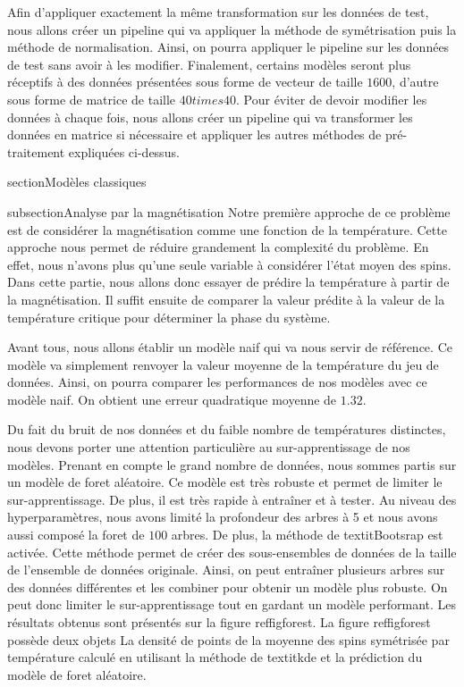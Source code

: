Afin d'appliquer exactement la même transformation sur les données de test, nous allons créer un pipeline qui va appliquer la méthode de symétrisation puis la méthode de normalisation. Ainsi, on pourra appliquer le pipeline sur les données de test sans avoir à les modifier.
Finalement, certains modèles seront plus réceptifs à des données présentées sous forme de vecteur de taille $1600$, d'autre sous forme de matrice de taille $40 times 40$. Pour éviter de devoir modifier les données à chaque fois, nous allons créer un pipeline qui va transformer les données en matrice si nécessaire et appliquer les autres méthodes de pré-traitement expliquées ci-dessus.

section{Modèles classiques}

subsection{Analyse par la magnétisation}
Notre première approche de ce problème est de considérer la magnétisation comme une fonction de la température. Cette approche nous permet de réduire grandement la complexité du problème. En effet, nous n'avons plus qu'une seule variable à considérer  l'état moyen des spins. Dans cette partie, nous allons donc essayer de prédire la température à partir de la magnétisation. Il suffit ensuite de comparer la valeur prédite à la valeur de la température critique pour déterminer la phase du système.

Avant tous, nous allons établir un modèle naif qui va nous servir de référence. Ce modèle va simplement renvoyer la valeur moyenne de la température du jeu de données. Ainsi, on pourra comparer les performances de nos modèles avec ce modèle naif. On obtient une erreur quadratique moyenne de $1.32$.

Du fait du bruit de nos données et du faible nombre de températures distinctes, nous devons porter une attention particulière au sur-apprentissage de nos modèles.
Prenant en compte le grand nombre de données, nous sommes partis sur un modèle de foret aléatoire. Ce modèle est très robuste et permet de limiter le sur-apprentissage. De plus, il est très rapide à entraîner et à tester.
Au niveau des hyperparamètres, nous avons limité la profondeur des arbres à 5 et nous avons aussi composé la foret de $100$ arbres. De plus, la méthode de textit{Bootsrap} est activée. Cette méthode permet de créer des sous-ensembles de données de la taille de l'ensemble de données originale. Ainsi, on peut entraîner plusieurs arbres sur des données différentes et les combiner pour obtenir un modèle plus robuste.
On peut donc limiter le sur-apprentissage tout en gardant un modèle performant. Les résultats obtenus sont présentés sur la figure ref{figforest}.
La figure ref{figforest} possède deux objets  La densité de points de la moyenne des spins symétrisée par température calculé en utilisant la méthode de textit{kde} et la prédiction du modèle de foret aléatoire.

